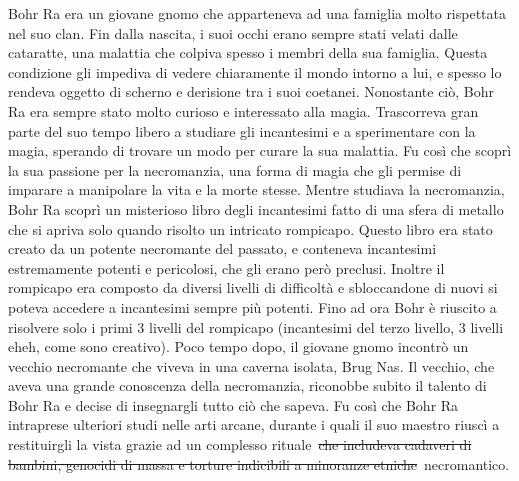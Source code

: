 Bohr Ra era un giovane gnomo che apparteneva ad una famiglia molto
rispettata nel suo clan. Fin dalla nascita, i suoi occhi erano sempre
stati velati dalle cataratte, una malattia che colpiva spesso i membri
della sua famiglia. Questa condizione gli impediva di vedere chiaramente
il mondo intorno a lui, e spesso lo rendeva oggetto di scherno e
derisione tra i suoi coetanei. Nonostante ciò, Bohr Ra era sempre stato
molto curioso e interessato alla magia. Trascorreva gran parte del suo
tempo libero a studiare gli incantesimi e a sperimentare con la magia,
sperando di trovare un modo per curare la sua malattia. Fu così che
scoprì la sua passione per la necromanzia, una forma di magia che gli
permise di imparare a manipolare la vita e la morte stesse. Mentre
studiava la necromanzia, Bohr Ra scoprì un misterioso libro degli
incantesimi fatto di una sfera di metallo che si apriva solo quando
risolto un intricato rompicapo. Questo libro era stato creato da un
potente necromante del passato, e conteneva incantesimi estremamente
potenti e pericolosi, che gli erano però preclusi. Inoltre il rompicapo
era composto da diversi livelli di difficoltà e sbloccandone di nuovi si
poteva accedere a incantesimi sempre più potenti. Fino ad ora Bohr è
riuscito a risolvere solo i primi 3 livelli del rompicapo (incantesimi
del terzo livello, 3 livelli eheh, come sono creativo). Poco tempo dopo,
il giovane gnomo incontrò un vecchio necromante che viveva in una
caverna isolata, Brug Nas. Il vecchio, che aveva una grande conoscenza
della necromanzia, riconobbe subito il talento di Bohr Ra e decise di
insegnargli tutto ciò che sapeva. Fu così che Bohr Ra intraprese
ulteriori studi nelle arti arcane, durante i quali il suo maestro riuscì
a restituirgli la vista grazie ad un complesso rituale~\st{che includeva
cadaveri di bambini, genocidi di massa e torture indicibili a minoranze
etniche}~necromantico.
